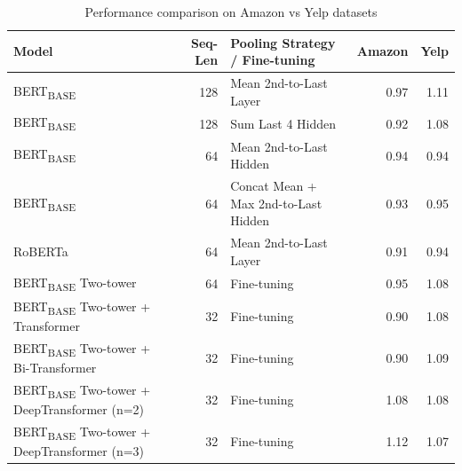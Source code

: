 \documentclass[11pt,a4paper]{article}
\begin{document}
\begin{table}[h]
\centering
\small
\begin{tabular}{@{} l r l *2r @{}}
\toprule
\multicolumn{1}{l}{\textbf{Model}} & \textbf{Seq-Len} & \textbf{Pooling Strategy / Fine-tuning} & \textbf{Amazon} & \textbf{Yelp}  \\ 
\midrule
 BERT\textsubscript{BASE} & 128 & Mean 2nd-to-Last Layer & 0.97 & 1.11 \\ 
 BERT\textsubscript{BASE} & 128 & Sum Last 4 Hidden & 0.92 & 1.08 \\
 BERT\textsubscript{BASE} & 64 & Mean 2nd-to-Last Hidden & 0.94 & 0.94 \\
 BERT\textsubscript{BASE} & 64 & Concat Mean + Max 2nd-to-Last Hidden & 0.93 & 0.95 \\
 RoBERTa & 64 & Mean 2nd-to-Last Layer & 0.91 & 0.94 \\
 BERT\textsubscript{BASE} Two-tower & 64 & Fine-tuning & 0.95 & 1.08 \\
 BERT\textsubscript{BASE} Two-tower + Transformer & 32 & Fine-tuning & 0.90 & 1.08 \\
 BERT\textsubscript{BASE} Two-tower + Bi-Transformer & 32 & Fine-tuning & 0.90 & 1.09 \\
 BERT\textsubscript{BASE} Two-tower + DeepTransformer (n=2) & 32 & Fine-tuning & 1.08 & 1.08 \\
 BERT\textsubscript{BASE} Two-tower + DeepTransformer (n=3) & 32 & Fine-tuning & 1.12 & 1.07 \\
\bottomrule
\end{tabular}
\caption{Performance comparison on Amazon vs Yelp datasets}
\end{table}
\end{document}
